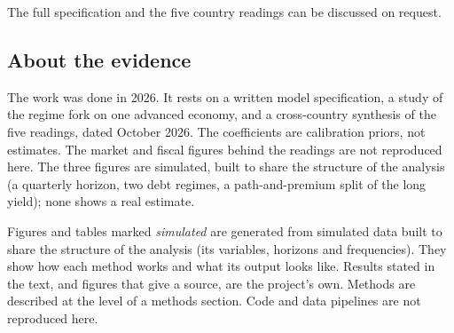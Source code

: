 \documentclass[
  british,
  a4paper,
]{article}
\newcounter{none} %
\begin{document}
The full specification and the five country readings can be discussed on
request.

\subsection{About the evidence}\label{about-the-evidence}

The work was done in 2026. It rests on a written model specification, a
study of the regime fork on one advanced economy, and a cross-country
synthesis of the five readings, dated October 2026. The coefficients are
calibration priors, not estimates. The market and fiscal figures behind
the readings are not reproduced here. The three figures are simulated,
built to share the structure of the analysis (a quarterly horizon, two
debt regimes, a path-and-premium split of the long yield); none shows a
real estimate.

Figures and tables marked \emph{simulated} are generated from simulated
data built to share the structure of the analysis (its variables,
horizons and frequencies). They show how each method works and what its
output looks like. Results stated in the text, and figures that give a
source, are the project's own. Methods are described at the level of a
methods section. Code and data pipelines are not reproduced here.
\end{document}
